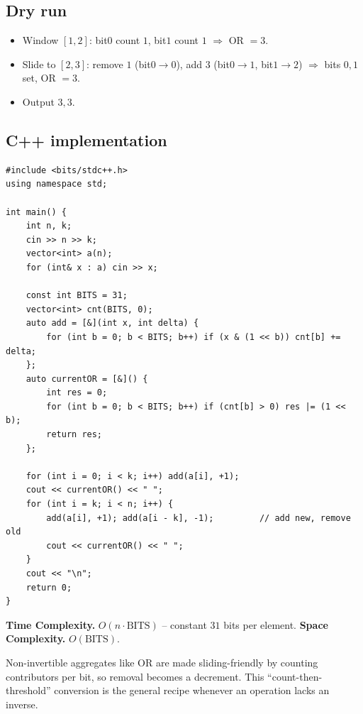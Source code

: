 \subsection*{Dry run}


\begin{itemize}
  \item Window $[1,2]$: bit$0$ count $1$, bit$1$ count $1$ $\Rightarrow$
        OR $=3$.
  \item Slide to $[2,3]$: remove $1$ (bit$0\to0$), add $3$ (bit$0\to1$,
        bit$1\to2$) $\Rightarrow$ bits $0,1$ set, OR $=3$.
  \item Output $3,3$.
\end{itemize}

\subsection*{C++ implementation}

\begin{lstlisting}
#include <bits/stdc++.h>
using namespace std;

int main() {
    int n, k;
    cin >> n >> k;
    vector<int> a(n);
    for (int& x : a) cin >> x;

    const int BITS = 31;
    vector<int> cnt(BITS, 0);
    auto add = [&](int x, int delta) {
        for (int b = 0; b < BITS; b++) if (x & (1 << b)) cnt[b] += delta;
    };
    auto currentOR = [&]() {
        int res = 0;
        for (int b = 0; b < BITS; b++) if (cnt[b] > 0) res |= (1 << b);
        return res;
    };

    for (int i = 0; i < k; i++) add(a[i], +1);
    cout << currentOR() << " ";
    for (int i = k; i < n; i++) {
        add(a[i], +1); add(a[i - k], -1);         // add new, remove old
        cout << currentOR() << " ";
    }
    cout << "\n";
    return 0;
}
\end{lstlisting}

\begin{complexitybox}
\textbf{Time Complexity.} $O(n\cdot\text{BITS})$ -- constant $31$ bits per
element. \textbf{Space Complexity.} $O(\text{BITS})$.
\end{complexitybox}

\begin{takeawaybox}
Non-invertible aggregates like OR are made sliding-friendly by counting
contributors per bit, so removal becomes a decrement. This
``count-then-threshold'' conversion is the general recipe whenever an
operation lacks an inverse.
\end{takeawaybox}
